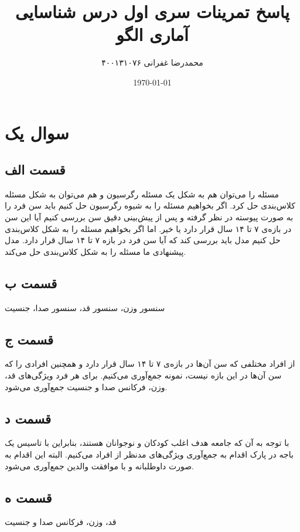 \documentclass[14pt,a4]{article}
\title{\vspace{-4cm} \textbf{پاسخ تمرینات سری اول درس شناسایی آماری الگو}}
\author{محمدرضا غفرانی  ۴۰۰۱۳۱۰۷۶}
\date{\today}
\begin{document}
\maketitle

\section*{سوال یک}

\subsection*{قسمت الف}

مسئله را می‌توان هم به شکل یک مسئله‌ رگرسیون و هم می‌توان به شکل مسئله‌ کلاس‌بندی حل کرد.
اگر بخواهیم مسئله را به شیوه‌ رگرسیون حل کنیم باید سن فرد را به صورت پیوسته
در نظر گرفته و پس از پیش‌بینی دقیق سن بررسی کنیم آیا این سن در بازه‌ی ۷ تا ۱۴ سال قرار
دارد یا خیر. اما اگر بخواهیم مسئله را به شکل کلاس‌بندی حل کنیم مدل باید بررسی کند که آیا سن
فرد در بازه ۷ تا ۱۴ سال قرار دارد. مدل پیشنهادی ما مسئله را به شکل کلاس‌بندی حل می‌کند.

\subsection*{قسمت ب}

سنسور وزن، سنسور قد، سنسور صدا، جنسیت

\subsection*{قسمت ج}

از افراد مختلفی که سن‌ آن‌ها در بازه‌ی ۷ تا ۱۴ سال قرار دارد و همچنین افرادی را که
سن آن‌ها در این بازه نیست، نمونه جمع‌آوری می‌کنیم. برای هر فرد ویژگی‌های
قد، وزن، فرکانس صدا و جنسیت جمع‌آوری می‌شود.‌

\subsection*{قسمت د}

با توجه به آن که جامعه‌ هدف اغلب کودکان و نوجوانان هستند، بنابراین با تاسیس
یک باجه در پارک اقدام به جمع‌آوری ویژگی‌های مدنظر از افراد می‌کنیم. البته این اقدام به
صورت داوطلبانه و با موافقت والدین جمع‌آوری می‌شود.

\subsection*{قسمت ه}

قد، وزن، فرکانس صدا و جنسیت
\end{document}
